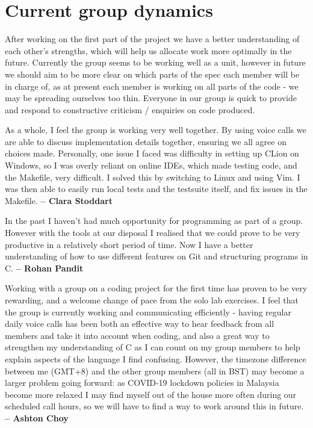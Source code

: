 \documentclass[11pt]{article}
\begin{document}
\section{Current group dynamics}
After working on the first part of the project we have a better understanding of each other's strengths, which will help us allocate work more optimally in the future. Currently the group seems to be working well as a unit, however in future we should aim to be more clear on which parts of the spec each member will be in charge of, as at present each member is working on all parts of the code - we may be spreading ourselves too thin. Everyone in our group is quick to provide and respond to constructive criticism / enquiries on code produced.

As a whole, I feel the group is working very well together. By using voice calls we are able to discuss implementation details together, ensuring we all agree on choices made. Personally, one issue I faced was difficulty in setting up CLion on Windows, so I was overly reliant on online IDEs, which made testing code, and the Makefile, very difficult. I solved this by switching to Linux and using Vim. I was then able to easily run local tests and the testsuite itself, and fix issues in the Makefile. \textbf{-- Clara Stoddart}

\tab In the past I haven't had much opportunity for programming as part of a group. However with the tools at our disposal I realised that we could prove to be very productive in a relatively short period of time. Now I have a better understanding of how to use different features on Git and structuring programs in C.
\textbf{-- Rohan Pandit}

Working with a group on a coding project for the first time has proven to be very rewarding, and a welcome change of pace from the solo lab exercises. I feel that the group is currently working and communicating efficiently - having regular daily voice calls has been both an effective way to hear feedback from all members and take it into account when coding, and also a great way to strengthen my understanding of C as I can count on my group members to help explain aspects of the language I find confusing. However, the timezone difference between me (GMT+8) and the other group members (all in BST) may become a larger problem going forward: as COVID-19 lockdown policies in Malaysia become more relaxed I may find myself out of the house more often during our scheduled call hours, so we will have to find a way to work around this in future.
\textbf{-- Ashton Choy}
\end{document}
